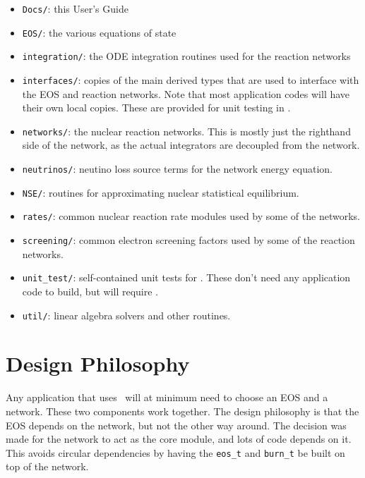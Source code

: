 \begin{itemize}
\item {\tt Docs/}: this User's Guide

\item {\tt EOS/}: the various equations of state

\item {\tt integration/}: the ODE integration routines used for the
  reaction networks

\item {\tt interfaces/}: copies of the main derived types that are used to
  interface with the EOS and reaction networks.  Note that most application
  codes will have their own local copies.  These are provided for unit testing
  in \microphysics.

\item {\tt networks/}: the nuclear reaction networks.  This is mostly just the
  righthand side of the network, as the actual integrators are decoupled from
  the network.

\item {\tt neutrinos/}: neutino loss source terms for the network energy equation.

\item {\tt NSE/}: routines for approximating nuclear statistical equilibrium.

\item {\tt rates/}: common nuclear reaction rate modules used by some of the 
  networks.

\item {\tt screening/}: common electron screening factors used by some of the 
  reaction networks.

\item {\tt unit\_test/}: self-contained unit tests for \microphysics.  These don't
  need any application code to build, but will require \amrex.

\item {\tt util/}: linear algebra solvers and other routines.

\end{itemize}



\section{Design Philosophy}

Any application that uses \microphysics\ will at minimum need to
choose an EOS and a network.  These two components work together.  The
design philosophy is that the EOS depends on the network, but not the
other way around.  The decision was made for the network to act as the
core module, and lots of code depends on it.  This avoids circular
dependencies by having the {\tt eos\_t} and {\tt burn\_t} be built on
top of the network.


